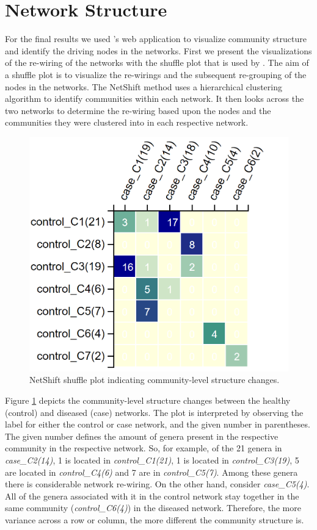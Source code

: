 \section{Network Structure}\label{res:shift}
For the final results we used \citeauthor{Kuntal2018}'s web application to visualize community structure and identify the driving nodes in the networks. First we present the visualizations of the re-wiring of the networks with the shuffle plot that is used by \citeauthor{Kuntal2018}. The aim of a shuffle plot is to visualize the re-wirings and the subsequent re-grouping of the nodes in the networks. The NetShift method uses a hierarchical clustering algorithm to identify communities within each network. It then looks across the two networks to determine the re-wiring based upon the nodes and the communities they were clustered into in each respective network.
\begin{figure}[!thbp]
    \centering
    \includegraphics[width=0.8\linewidth]{figure/results/shuffle_plot.png}
    \caption[NetShift shuffle plot indicating community-level structure changes.]{NetShift shuffle plot indicating community-level structure changes.}
    \label{fig:res-shuffle}
\end{figure}
Figure \ref{fig:res-shuffle} depicts the community-level structure changes between the healthy (control) and diseased (case) networks. The plot is interpreted by observing the label for either the control or case network, and the given number in parentheses. The given number defines the amount of genera present in the respective community in the respective network. So, for example, of the 21 genera in \textit{case\_C2(14)}, 1 is located in \textit{control\_C1(21)}, 1 is located in \textit{control\_C3(19)}, 5 are located in \textit{control\_C4(6)} and 7 are in \textit{control\_C5(7)}. Among these genera there is considerable network re-wiring. On the other hand, consider \textit{case\_C5(4)}. All of the genera associated with it in the control network stay together in the same community (\textit{control\_C6(4)}) in the diseased network. Therefore, the more variance across a row or column, the more different the community structure is.  

